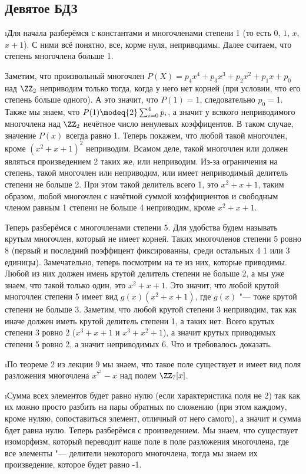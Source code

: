 \subsection{Девятое БДЗ}

\i Для начала разберёмся с константами и многочленами степени 1 (то есть $0$, $1$, $x$, $x+1$). С ними всё понятно, все, корме нуля, неприводимы. Далее считаем, что степень многочлена больше 1.
\par Заметим, что произвольный многочлен $P(X) = p_4x^4 + p_3x^3 + p_2x^2 + p_1x + p_0$ над $\ZZ_2$ неприводим только тогда, когда у него нет корней (при условии, что его степень больше одного). А это значит, что $P(1) = 1$, следовательно $p_0 = 1$. Также мы знаем, что $P(1) \modeq{2} \sum_{i=0}^4p_i$, а значит у всякого неприводимого многочлена над $\ZZ_2$ нечётное число ненулевых коэффицентов. В таком случае, значение $P(x)$ всегда равно 1. Теперь покажем, что любой такой многочлен, кроме $(x^2 + x + 1)^2$ неприводим. Всамом деле, такой многочлен или должен являться произведением 2 таких же, или неприводим. Из-за ограничения на степень, такой многочлен или неприводим, или имеет неприводимый делитель степени не больше 2. При этом такой делитель всего 1, это $x^2 + x + 1$, таким образом, любой многочлен с начётной суммой коэффициентов и свободным членом равным 1 степени не больше 4 неприводим, кроме $x^2 + x + 1$.
\par Теперь разберёмся с многочленами степени 5. Для удобства будем называть крутым многочлен, который не имеет корней. Таких многочленов степени 5 ровно 8 (первый и последний поэффицент фиксированны, среди остальных 4 1 или 3 единицы). Замечательно, теперь посмотрим на те из них, которые приводимы. Любой из них должен имень крутой делитель степени не больше 2, а мы уже знаем, что такой только один, это $x^2 + x + 1$. Это значит, что любой крутой многочлен степени 5 имеет вид $g(x)(x^2 + x + 1)$, где $g(x)$ "--- тоже крутой степени не больше 3. Заметим, что любой крутой степени 3 неприводим, так как иначе должен иметь крутой делитель степени 1, а таких нет. Всего крутых степени 3 ровно 2 ($x^3 + x + 1$ и $x^3 + x^2 + 1$), а значит крутых приводимых степени 5 ровно 2, а значит неприводимых 6. Что и требовалось доказать.


\i По теореме 2 из лекции 9 мы знаем, что такое поле существует и имеет вид поля разложения многочлена $x^{7^3} - x$ над полем $\ZZ_7[x]$. 


\i Сумма всех элементов будет равно нулю (если характеристика поля не 2) так как их можно просто разбить на пары обратных по сложению (при этом каждому, кроме нуляю, сопоставиться элемент, отличный от него самого), а значит и сумма бдет равна нулю. Теперь разберёмся с произведением. Мы знаем, что существует изоморфизм, который переводит наше поле в поле разложения многочлена, где все элементы "--- делители некоторого многочлена, тогда мы знаем их произведение, которое будет равно -1.



